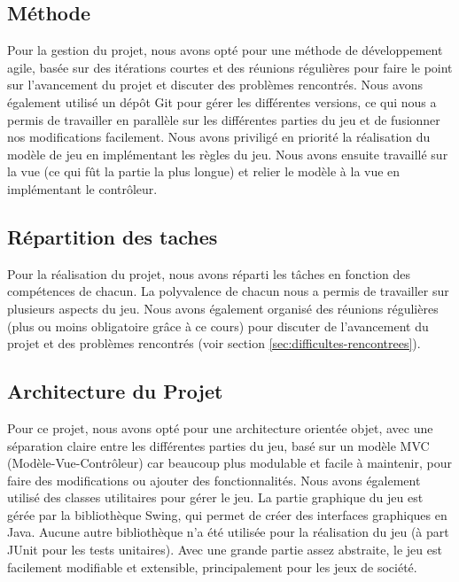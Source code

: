\documentclass{article}
\begin{document}
    \subsection{Méthode}\label{subsec:methode}

    Pour la gestion du projet, nous avons opté pour une méthode de développement agile, basée sur des itérations courtes et des réunions régulières pour faire le point sur l'avancement du projet et discuter des problèmes rencontrés.
    Nous avons également utilisé un dépôt Git pour gérer les différentes versions, ce qui nous a permis de travailler en parallèle sur les différentes parties du jeu et de fusionner nos modifications facilement.
    Nous avons priviligé en priorité la réalisation du modèle de jeu en implémentant les règles du jeu.
    Nous avons ensuite travaillé sur la vue (ce qui fût la partie la plus longue) et relier le modèle à la vue en implémentant le contrôleur.

    \subsection{Répartition des taches}\label{subsec:repartition-des-taches}
    Pour la réalisation du projet, nous avons réparti les tâches en fonction des compétences de chacun.
    La polyvalence de chacun nous a permis de travailler sur plusieurs aspects du jeu.
    Nous avons également organisé des réunions régulières (plus ou moins obligatoire grâce à ce cours) pour discuter de l'avancement du projet et des problèmes rencontrés (voir section \ref{sec:difficultes-rencontrees}).

    \subsection{Architecture du Projet}\label{subsec:architecture-du-projet}
    Pour ce projet, nous avons opté pour une architecture orientée objet, avec une séparation claire entre les différentes parties du jeu, basé sur un modèle MVC (Modèle-Vue-Contrôleur) car beaucoup plus modulable et facile à maintenir, pour faire des modifications ou ajouter des fonctionnalités.
    Nous avons également utilisé des classes utilitaires pour gérer le jeu.
    La partie graphique du jeu est gérée par la bibliothèque Swing, qui permet de créer des interfaces graphiques en Java.
    Aucune autre bibliothèque n'a été utilisée pour la réalisation du jeu (à part JUnit pour les tests unitaires).
    Avec une grande partie assez abstraite, le jeu est facilement modifiable et extensible, principalement pour les jeux de société.
\end{document}
